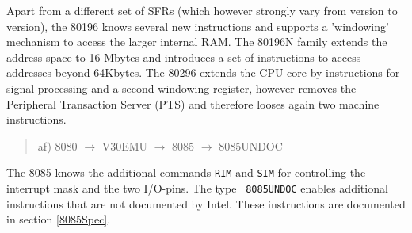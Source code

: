 \documentclass[12pt,twoside]{report}
\newcommand{\tty}[1]{{\tt #1}}
\begin{document}
Apart from a different set of SFRs (which however strongly vary from
version to version), the 80196 knows several new instructions and
supports a 'windowing' mechanism to access the larger internal RAM.
The 80196N family extends the address space to 16 Mbytes and
introduces a set of instructions to access addresses beyond 64Kbytes.
The 80296 extends the CPU core by instructions for signal processing
and a second windowing register, however removes the Peripheral
Transaction Server (PTS) and therefore looses again two machine
instructions.
\begin{quote}
af) 8080 $\rightarrow$ V30EMU $\rightarrow$ 8085 $\rightarrow$ 8085UNDOC
\end{quote}
The 8085 knows the additional commands \tty{RIM} and \tty{SIM} for
controlling the interrupt mask and the two I/O-pins.  The type {\tt
8085UNDOC} enables additional instructions that are not documented
by Intel.  These instructions are documented in section \ref{8085Spec}.
\end{document}
